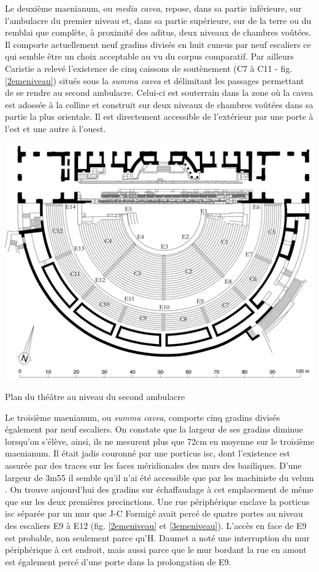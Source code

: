 Le deuxième \gls{maenianum}, ou \textit{media cavea}, repose, dans sa partie inférieure, sur l'\gls{ambulacre} du premier niveau et, dans sa partie supérieure, sur de la terre ou du remblai que complète, à proximité des \gls{aditus}, deux niveaux de chambres voûtées. Il comporte actuellement neuf gradins divisés en huit \gls{cuneus} par neuf escaliers ce qui semble être un choix acceptable au vu du corpus comparatif. Par ailleurs Caristie a relevé l'existence de cinq caissons de soutènement (C7 à C11 - fig. \ref{2emeniveau}) situés sous la \textit{summa cavea} et délimitant les passages permettant de se rendre au second \gls{ambulacre}. Celui-ci est souterrain dans la zone où la \gls{cavea} est adossée à la colline et construit sur deux niveaux de chambres voûtées dans sa partie la plus orientale. Il est directement accessible de l'extérieur par une porte à l'est et une autre à l'ouest.
		
	\begin{figureth}
		\includegraphics[width=\linewidth]{images/2emeniveau}
		\caption[Vue de dessus - 2ème niveau]{Plan du théâtre au niveau du second \gls{ambulacre} \cite[Pl. XVIII]{orangePl}}
		\label{2emeniveau}
	\end{figureth}		
		
		
Le troisième \gls{maenianum}, ou \textit{summa cavea}, comporte cinq gradins divisés également par neuf escaliers. On constate que la largeur de ses gradins diminue lorsqu'on s'élève, ainsi, ils ne mesurent plus que 72cm en moyenne sur le troisième \gls{maenianum}. Il était jadis couronné par une \gls{porticus isc}, dont l'existence est assurée par des traces sur les faces méridionales des murs des \glspl{basilique}. D'une largeur de 3m55 il semble qu'il n'ai été accessible que par les machiniste du \gls{velum} \cite{formige}. On trouve aujourd'hui des gradins sur échaffaudage à cet emplacement de même que sur les deux premières \glspl{precinction}. Une rue périphérique enclave la \gls{porticus isc} séparée par un mur que J-C Formigé avait percé de quatre portes au niveau des escaliers E9 à E12 (fig. \ref{2emeniveau} et \ref{3emeniveau}). L'accès en face de E9 est probable, non seulement parce qu'H. Daumet a noté une interruption du mur périphérique à cet endroit, mais aussi parce que le mur bordant la rue en amont est également percé d'une porte dans la prolongation de E9.



